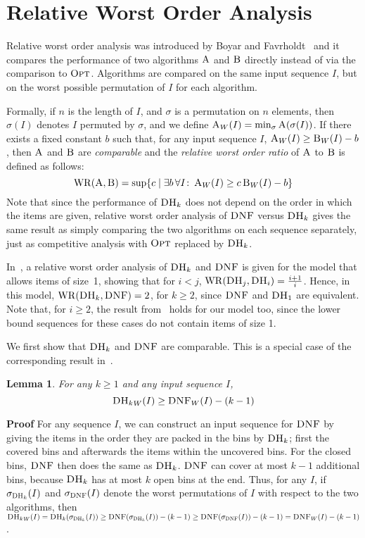 \documentclass[11pt]{article}
\newtheorem{xlemma}{Lemma}
\newenvironment{lemma}{\begin{xlemma}\rm}{\end{xlemma}}
\newenvironment{proof}{\begin{trivlist}\item[]{\bf Proof }}{\hspace*{\fill}\raisebox{-1pt}{\boldmath$\Box$}\end{trivlist}}
\newcommand{\ALG}{\ensuremath{\operatorname{\textsc{A}}}\xspace}
\newcommand{\ALGB}{\ensuremath{\operatorname{\textsc{B}}}\xspace}
\newcommand{\OPT}{\ensuremath{\operatorname{\textsc{Opt}}}\xspace}
\newcommand{\DNF}{\ensuremath{\operatorname{\textsc{DNF}}}\xspace}
\newcommand{\DHk}{{\ensuremath{\textsc{DH}_k}}\xspace}
\newcommand{\DHone}{{\ensuremath{\textsc{DH}_{1}}}\xspace}
\newcommand{\DHi}{{\ensuremath{\textsc{DH}_i}}\xspace}
\newcommand{\DHj}{{\ensuremath{\textsc{DH}_j}}\xspace}
\newcommand{\SETOF}[2]{\{#1 \mid #2\}}
\newcommand{\WR}{\ensuremath{\mathrm{WR}}\xspace}
\newcommand{\RWOR}[2]{\ensuremath{\WR(#1,#2)}\xspace}
\begin{document}
\section{Relative Worst Order Analysis}
Relative worst order analysis was introduced by Boyar and
Favrholdt~\cite{BF07j} and it
compares the performance of two algorithms $\ALG$ and $\ALGB$ directly
instead of via 
the comparison to \OPT. Algorithms are compared on the same input
sequence $I$, but on the worst possible permutation of $I$
for each algorithm.

Formally,
if $n$ is the length of $I$, and $\sigma$ is a permutation on $n$ elements,
then $\sigma(I)$ denotes $I$ permuted by $\sigma$, and
we define $\ALG_W(I) = \min_\sigma \ALG(\sigma(I))$.
If there exists a fixed constant $b$ such that, for any input sequence
$I$, $\ALG_W(I) \geq \ALGB_W(I) - b$, then $\ALG$ and $\ALGB$ are {\em comparable}
and the {\em relative worst order ratio} of $\ALG$ to $\ALGB$ is defined as follows:
$$\RWOR{\ALG}{\ALGB} = 
 \sup \SETOF{c}{\exists b \, \forall I \colon \ALG_W(I) \geq c \ALGB_W(I) - b}$$
Note that since the performance of \DHk does not depend on the
order in which the items are given, relative worst order analysis of
\DNF versus \DHk gives the same result as simply comparing the two
algorithms on each sequence separately, just as competitive analysis
with \OPT replaced by \DHk.

In~\cite{EFK12}, a relative worst order analysis of \DHk and \DNF is given
 for the model that allows items of size~1,
showing that for $i<j$, $\RWOR{\DHj}{\DHi} = \frac{i+1}{i}$.
Hence, in this model, $\RWOR{\DHk}{\DNF}=2$, for $k \geq 2$, since
 \DNF and \DHone are equivalent.
Note that, for $i \geq 2$, the result from~\cite{EFK12} holds for our
 model too, since the lower bound sequences for these cases do not
 contain items of size 1.

We first show that \DHk and \DNF are comparable.
This is a special case of the corresponding result in~\cite{EFK12}.
\begin{lemma}\label{lemma_Harbetter}
For any $k\geq 1$ and any input sequence $I$,
\[\DHk_W(I) \geq \DNF_W(I)-(k-1)\]
\end{lemma}
\begin{proof}
For any sequence $I$, we can construct an input sequence for \DNF by giving the items in the order they are packed in the bins by \DHk; first the covered bins and afterwards the items within the uncovered bins. For the closed bins, \DNF then does the same as \DHk. \DNF can cover at most $k-1$ additional bins, because \DHk has at most $k$ open bins at the end.
Thus, for any $I$, if $\sigma_{\DHk}(I)$ and $\sigma_{\DNF}(I)$ denote
 the worst permutations of $I$ with respect to the two algorithms, then
 $\DHk_W(I) = \DHk(\sigma_{\DHk}(I)) \geq \DNF(\sigma_{\DHk}(I))-(k-1) \geq
 \DNF(\sigma_{\DNF}(I))-(k-1) = \DNF_W(I)-(k-1)$. 
\end{proof}
\end{document}
